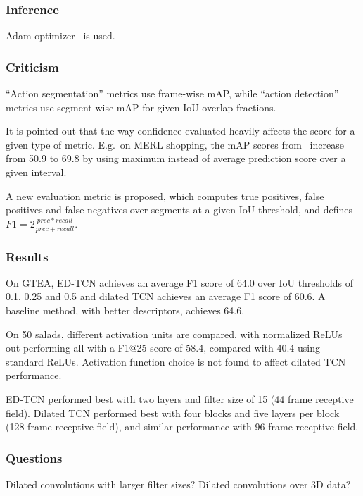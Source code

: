 \documentclass[a4paper, 12pt]{article}
\begin{document}
\subsubsection{Inference}

Adam optimizer~\cite{DBLP:journals/corr/KingmaB14} is used.

\subsubsection{Criticism}

``Action segmentation'' metrics use frame-wise mAP, while ``action detection''
metrics use segment-wise mAP for given IoU overlap fractions.

It is pointed out that the way confidence evaluated heavily affects the score
for a given type of metric. E.g.\ on MERL shopping, the mAP scores
from~\cite{merl-shopping-singh} increase from 50.9 to 69.8 by using maximum
instead of average prediction score over a given interval.

A new evaluation metric is proposed, which computes true positives, false
positives and false negatives over segments at a given IoU threshold, and defines
$F1 = 2\frac{prec * recall}{prec + recall}$.

\subsubsection{Results}

On GTEA, ED-TCN achieves an average F1 score of 64.0 over IoU thresholds of
0.1, 0.25 and 0.5 and dilated TCN achieves an average F1 score of 60.6. A
baseline method, with better descriptors, achieves 64.6.

On 50 salads, different activation units are compared, with normalized ReLUs
out-performing all with a F1@25 score of 58.4, compared with 40.4 using
standard ReLUs. Activation function choice is not found to affect dilated TCN
performance.

ED-TCN performed best with two layers and filter size of 15 (44 frame receptive
field). Dilated TCN performed best with four blocks and five layers per block
(128 frame receptive field), and similar performance with 96 frame receptive
field.

\subsubsection{Questions}

Dilated convolutions with larger filter sizes? Dilated convolutions over 3D
data?
\end{document}
